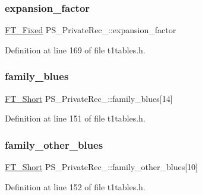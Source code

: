 \mbox{\label{struct_p_s___private_rec___a45cf6e07c4c26f029e66998e6cad9fa0}} 
\subsubsection{\texorpdfstring{expansion\_factor}{expansion\_factor}}
{\footnotesize\ttfamily \mbox{\hyperlink{fttypes_8h_a5f5a679cc09f758efdd0d1c5feed3c3d}{F\+T\+\_\+\+Fixed}} P\+S\+\_\+\+Private\+Rec\+\_\+\+::expansion\+\_\+factor}



Definition at line 169 of file t1tables.\+h.

\mbox{\label{struct_p_s___private_rec___aa6645b5810e4e8b7d1a8b57300cdf406}} 
\subsubsection{\texorpdfstring{family\_blues}{family\_blues}}
{\footnotesize\ttfamily \mbox{\hyperlink{fttypes_8h_aa7279be89046a2563cd3d4d6651fbdcf}{F\+T\+\_\+\+Short}} P\+S\+\_\+\+Private\+Rec\+\_\+\+::family\+\_\+blues\mbox{[}14\mbox{]}}



Definition at line 151 of file t1tables.\+h.

\mbox{\label{struct_p_s___private_rec___aaff4f071eee676aff4e5ca61ba30c218}} 
\subsubsection{\texorpdfstring{family\_other\_blues}{family\_other\_blues}}
{\footnotesize\ttfamily \mbox{\hyperlink{fttypes_8h_aa7279be89046a2563cd3d4d6651fbdcf}{F\+T\+\_\+\+Short}} P\+S\+\_\+\+Private\+Rec\+\_\+\+::family\+\_\+other\+\_\+blues\mbox{[}10\mbox{]}}



Definition at line 152 of file t1tables.\+h.

